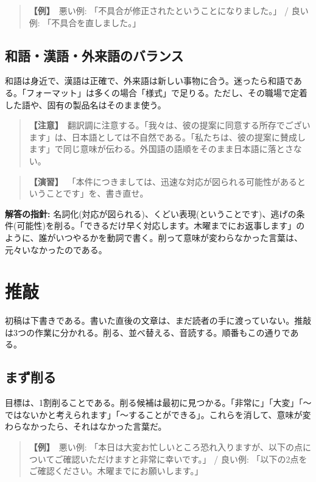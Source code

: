 \documentclass{article}
\begin{document}
\begin{quote}
\textbf{【例】}\ 悪い例: 「不具合が修正されたということになりました。」 / 良い例: 「不具合を直しました。」
\end{quote}

\subsection{和語・漢語・外来語のバランス}

和語は身近で、漢語は正確で、外来語は新しい事物に合う。迷ったら和語である。「フォーマット」は多くの場合「様式」で足りる。ただし、その職場で定着した語や、固有の製品名はそのまま使う。

\begin{quote}
\textbf{【注意】}\ 翻訳調に注意する。「我々は、彼の提案に同意する所存でございます」は、日本語としては不自然である。「私たちは、彼の提案に賛成します」で同じ意味が伝わる。外国語の語順をそのまま日本語に落とさない。
\end{quote}

\begin{quote}
\textbf{【演習】}\ 「本件につきましては、迅速な対応が図られる可能性があるということです」を、書き直せ。
\end{quote}

\textbf{解答の指針:} 名詞化(対応が図られる)、くどい表現(ということです)、逃げの条件(可能性)を削る。「できるだけ早く対応します。木曜までにお返事します」のように、誰がいつやるかを動詞で書く。削って意味が変わらなかった言葉は、元々いなかったのである。

\section{推敲}

初稿は下書きである。書いた直後の文章は、まだ読者の手に渡っていない。推敲は3つの作業に分かれる。削る、並べ替える、音読する。順番もこの通りである。

\subsection{まず削る}

目標は、1割削ることである。削る候補は最初に見つかる。「非常に」「大変」「〜ではないかと考えられます」「〜することができる」。これらを消して、意味が変わらなかったら、それはなかった言葉だ。

\begin{quote}
\textbf{【例】}\ 悪い例: 「本日は大変お忙しいところ恐れ入りますが、以下の点についてご確認いただけますと非常に幸いです。」 / 良い例: 「以下の2点をご確認ください。木曜までにお願いします。」
\end{quote}
\end{document}
